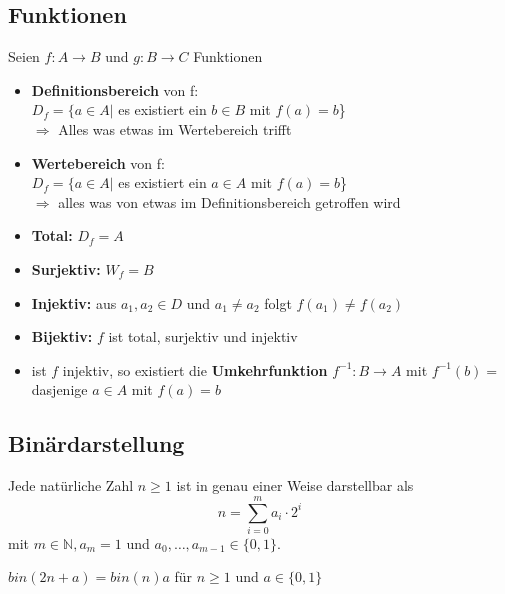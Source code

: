 \documentclass[14pt]{article}
\begin{document}
        \subsection{Funktionen}
        \begin{definition}[Funktionen]
            Seien $f: A \rightarrow B$ und $g : B \rightarrow C$ Funktionen
            \begin{itemize}
                \item \textbf{Definitionsbereich} von f: \\
                $D_f = \{a \in A |$ es existiert ein $ b \in B$ mit $f(a) = b$\} \\
                $\Rightarrow$ Alles was etwas im Wertebereich trifft
                \item \textbf{Wertebereich} von f: \\
                $D_f = \{a \in A |$ es existiert ein $ a \in A$ mit $f(a) = b$\} \\
                $\Rightarrow$ alles was von etwas im Definitionsbereich 
                getroffen wird
                \item \textbf{Total:} $D_f = A$
                \item \textbf{Surjektiv:} $W_f = B$
                \item \textbf{Injektiv:} aus $a_1, a_2 \in D$ und $a_1 \neq a_2$
                folgt $f(a_1) \neq f(a_2)$
                \item \textbf{Bijektiv:} $f$ ist total, surjektiv und injektiv
                \item ist $f$ injektiv, so existiert die \textbf{Umkehrfunktion}
                $f^{-1}: B \rightarrow A$ mit $f^{-1}(b) = $ dasjenige $a  \in A$
                mit $f(a) = b$
            \end{itemize}
        \end{definition}

        \subsection{Binärdarstellung}
        \begin{definition}
            Jede natürliche Zahl $n \geq 1$ ist in genau einer Weise darstellbar
            als 
            \[
                n = \sum_{i = 0}^m a_i \cdot 2^i
            \]
            mit $m \in \mathbb{N}, a_m = 1$ und $a_0, \dots, a_{m - 1} 
            \in \{0, 1\}$.
        \end{definition}
        \begin{eigenschaft}[Binärdarstellung]
            \begin{center}
            $bin(2n + a) = bin(n)a$ für $n \geq 1$ und $a \in  \{0, 1\}$ 
            \end{center}
        \end{eigenschaft}
\end{document}
